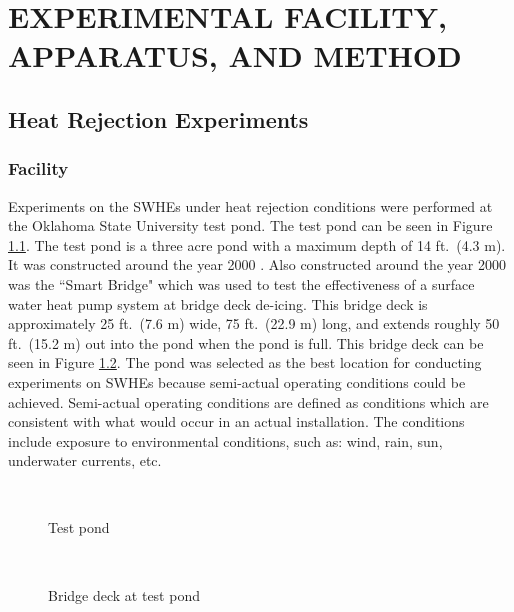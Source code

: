 
\chapter{EXPERIMENTAL FACILITY, APPARATUS, AND METHOD}
\label{ch:ExpMethod}
\section{Heat Rejection Experiments}
\label{sec:ExpMethod:HeatRej}
	\subsection{Facility}
	\label{subsec:ExpMethod:HeatRej:Facility}

Experiments on the SWHEs under heat rejection conditions were performed at the Oklahoma State University test pond. The test pond can be seen in Figure  \ref{fig:ExpMethod:HeatRej:Facility:PondMain}. The test pond is a three acre pond with a maximum depth of 14 ft.\ (4.3 m). It was constructed around the year 2000 \citep{LiuReesSpitler2003}. Also constructed around the year 2000 was the ``Smart Bridge" which was used to test the effectiveness of a surface water heat pump system at bridge deck de-icing. This bridge deck is approximately 25 ft.\ (7.6 m) wide, 75 ft.\ (22.9 m) long, and extends roughly 50 ft.\ (15.2 m) out into the pond when the pond is full. This bridge deck can be seen in Figure \ref{fig:ExpMethod:HeatRej:Facility:BridgeMain}. The pond was selected as the best location for conducting experiments on SWHEs because semi-actual operating conditions could be achieved. Semi-actual operating conditions are defined as conditions which are consistent with what would occur in an actual installation. The conditions include exposure to environmental conditions, such as: wind, rain, sun, underwater currents, etc.

	\begin{figure}
		\centering
		\,
		\caption{Test pond}
		\label{fig:ExpMethod:HeatRej:Facility:PondMain}
	\end{figure}


	\begin{figure}
		\centering
		\,
		\caption{Bridge deck at test pond}
		\label{fig:ExpMethod:HeatRej:Facility:BridgeMain}
	\end{figure}


